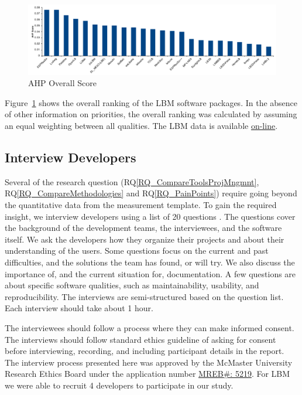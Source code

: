 \documentclass[runningheads]{llncs}
\newcommand{\rqref}[1]{RQ\ref{#1}}
\begin{document}
\begin{figure}[h!]
	\centering
		\includegraphics[width=1.0\textwidth]{./figures/finalscore_chart.pdf}
		\caption{AHP Overall Score}
		\label{Fig_OverallScore}
\end{figure}

Figure~\ref{Fig_OverallScore} shows the overall ranking of the LBM software
packages. In the absence of other information on priorities, the overall ranking
was calculated by assuming an equal weighting between all qualities.  The LBM data is available \href{https://github.com/smiths/AIMSS/blob/master/StateOfPractice/DomainMeasurements/LBM-Peter/Completed_LBS_Combined_MeasurementTemplate_EmpiricalMeasures_ADDED_MUSUBI_UPDATED_STATS.xlsx} {on-line}.

\subsection{Interview Developers} \label{SecSurvey}

Several of the research question (\rqref{RQ_CompareToolsProjMngmnt},
\rqref{RQ_CompareMethodologies} and \rqref{RQ_PainPoints}) require going beyond
the quantitative data from the measurement template. To gain the required
insight, we interview developers using a list of 20 questions
\cite{SmithEtAl2021}. The questions cover the background of the development
teams, the interviewees, and the software itself. We ask the developers how they
organize their projects and about their understanding of the users. Some
questions focus on the current and past difficulties, and the solutions the team
has found, or will try. We also discuss the importance of, and the current
situation for, documentation. A few questions are about specific software
qualities, such as maintainability, usability, and reproducibility. The
interviews are semi-structured based on the question list.  Each interview
should take about 1 hour.

The interviewees should follow a process where they can make informed consent.
The interviews should follow standard ethics guideline of asking for consent
before interviewing, recording, and including participant details in the report.
The interview process presented here was approved by the McMaster University
Research Ethics Board under the application number 
\href{https://github.com/smiths/AIMSS/blob/master/StateOfPractice/MACREM/Application.pdf}
{MREB\#: 5219}.  For LBM we were able to recruit 4 developers to participate in
our study.
\end{document}
